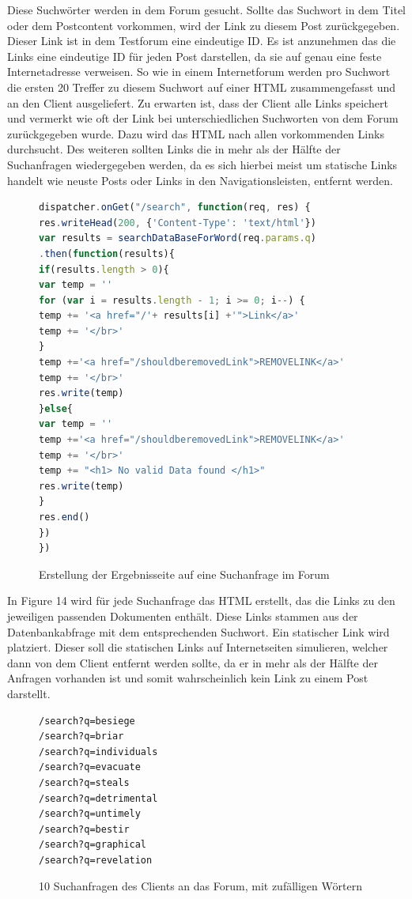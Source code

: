 Diese Suchwörter werden in dem Forum gesucht. Sollte das Suchwort in dem Titel oder dem Postcontent vorkommen, wird der Link zu diesem Post zurückgegeben. Dieser Link ist in dem Testforum eine eindeutige ID. Es ist anzunehmen das die Links eine eindeutige ID für jeden Post darstellen, da sie auf genau eine feste Internetadresse verweisen. So wie in einem Internetforum werden pro Suchwort die ersten 20 Treffer zu diesem Suchwort auf einer HTML zusammengefasst und an den Client ausgeliefert. Zu erwarten ist, dass der Client alle Links speichert und vermerkt wie oft der Link bei unterschiedlichen Suchworten von dem Forum zurückgegeben wurde. Dazu wird das HTML nach allen vorkommenden Links durchsucht. Des weiteren sollten Links die in mehr als der Hälfte der Suchanfragen wiedergegeben werden, da es sich hierbei meist um statische Links handelt wie neuste Posts oder Links in den Navigationsleisten, entfernt werden.
\newpage

\begin{figure}[h!]
\begin{lstlisting}[language=JavaScript]
dispatcher.onGet("/search", function(req, res) {
res.writeHead(200, {'Content-Type': 'text/html'})
var results = searchDataBaseForWord(req.params.q)
.then(function(results){
if(results.length > 0){
var temp = ''
for (var i = results.length - 1; i >= 0; i--) {
temp += '<a href="/'+ results[i] +'">Link</a>'
temp += '</br>'
}
temp +='<a href="/shouldberemovedLink">REMOVELINK</a>'
temp += '</br>'
res.write(temp)
}else{
var temp = ''
temp +='<a href="/shouldberemovedLink">REMOVELINK</a>'
temp += '</br>'
temp += "<h1> No valid Data found </h1>"
res.write(temp)
}
res.end() 
}) 
})
\end{lstlisting}
\caption{Erstellung der Ergebnisseite auf eine Suchanfrage im Forum}
\end{figure}

In Figure 14 wird für jede Suchanfrage das HTML erstellt, das die Links zu den jeweiligen passenden Dokumenten enthält. Diese Links stammen aus der Datenbankabfrage mit dem entsprechenden Suchwort.
Ein statischer Link wird platziert. Dieser soll die statischen Links auf Internetseiten simulieren, welcher dann von dem Client entfernt werden sollte, da er in mehr als der Hälfte der Anfragen vorhanden ist und somit wahrscheinlich kein Link zu einem Post darstellt.

\begin{figure}[h!]
\begin{lstlisting}[language=HTML5]
/search?q=besiege
/search?q=briar
/search?q=individuals
/search?q=evacuate
/search?q=steals
/search?q=detrimental
/search?q=untimely
/search?q=bestir
/search?q=graphical
/search?q=revelation
\end{lstlisting}
\caption{10 Suchanfragen des Clients an das Forum, mit zufälligen Wörtern}
\end{figure}

